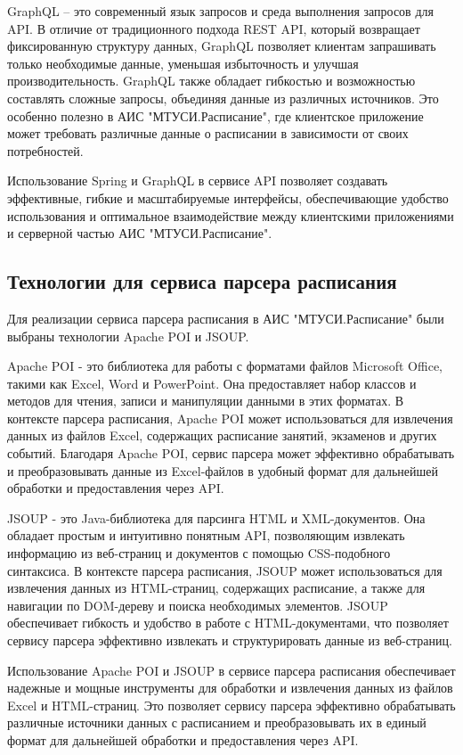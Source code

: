 GraphQL -- это современный язык запросов и среда выполнения запросов для API.
В отличие от традиционного подхода REST API, который возвращает фиксированную структуру данных,
GraphQL позволяет клиентам запрашивать только необходимые данные,
уменьшая избыточность и улучшая производительность.
GraphQL также обладает гибкостью и возможностью составлять сложные запросы, объединяя данные из различных источников.
Это особенно полезно в АИС "МТУСИ.Расписание", где клиентское приложение может требовать
различные данные о расписании в зависимости от своих потребностей.

Использование Spring и GraphQL в сервисе API позволяет создавать эффективные,
гибкие и масштабируемые интерфейсы, обеспечивающие удобство использования и
оптимальное взаимодействие между клиентскими приложениями и серверной частью АИС "МТУСИ.Расписание".

\subsection{Технологии для сервиса парсера расписания}
Для реализации сервиса парсера расписания в АИС "МТУСИ.Расписание" были выбраны технологии Apache POI и JSOUP.

Apache POI - это библиотека для работы с форматами файлов Microsoft Office,
такими как Excel, Word и PowerPoint. Она предоставляет набор классов и методов для чтения,
записи и манипуляции данными в этих форматах. В контексте парсера расписания,
Apache POI может использоваться для извлечения данных из файлов Excel,
содержащих расписание занятий, экзаменов и других событий.
Благодаря Apache POI, сервис парсера может эффективно обрабатывать и преобразовывать
данные из Excel-файлов в удобный формат для дальнейшей обработки и предоставления через API.

JSOUP - это Java-библиотека для парсинга HTML и XML-документов.
Она обладает простым и интуитивно понятным API, позволяющим извлекать информацию из веб-страниц и документов
с помощью CSS-подобного синтаксиса. В контексте парсера расписания, JSOUP может использоваться для извлечения данных из HTML-страниц,
содержащих расписание, а также для навигации по DOM-дереву и поиска необходимых элементов.
JSOUP обеспечивает гибкость и удобство в работе с HTML-документами, что
позволяет сервису парсера эффективно извлекать и структурировать данные из веб-страниц.

Использование Apache POI и JSOUP в сервисе парсера расписания обеспечивает
надежные и мощные инструменты для обработки и извлечения данных из файлов Excel и HTML-страниц.
Это позволяет сервису парсера эффективно обрабатывать различные источники данных с расписанием и преобразовывать их
в единый формат для дальнейшей обработки и предоставления через API.

